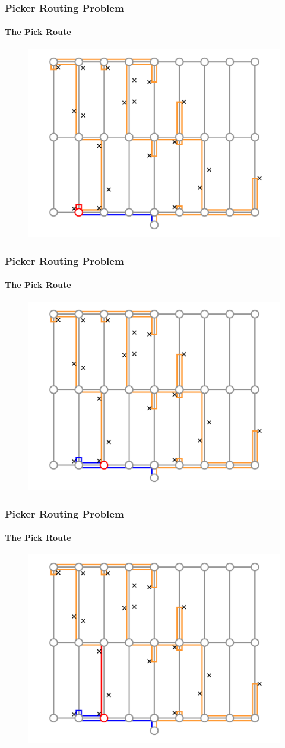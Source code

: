 \documentclass[english,a4,aspectratio=169]{beamer}
\begin{document}
\begin{frame}
\frametitle{Picker Routing Problem}
\framesubtitle{The Pick Route}
 \begin{figure}
  \centering
  \includegraphics[width=.6\textwidth]{../figures/path07.pdf}
 \end{figure}
\end{frame}

\begin{frame}
\frametitle{Picker Routing Problem}
\framesubtitle{The Pick Route}
 \begin{figure}
  \centering
  \includegraphics[width=.6\textwidth]{../figures/path09.pdf}
 \end{figure}
\end{frame}

\begin{frame}
\frametitle{Picker Routing Problem}
\framesubtitle{The Pick Route}
 \begin{figure}
  \centering
  \includegraphics[width=.6\textwidth]{../figures/path10.pdf}
 \end{figure}
\end{frame}
\end{document}
